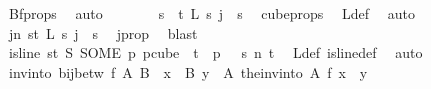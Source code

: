 \begin{isabellebody}
\ Bf{\isacharunderscore}{\kern0pt}props\ \isamarkupfalse%
\ auto\isanewline
\ \ \ \ \isamarkupfalse%
\ \isamarkupfalse%
\ {\isachardoublequoteopen}{\isasymforall}s\ {\isacharless}{\kern0pt}\ t{\isachardot}{\kern0pt}\ L\ s\ j\ {\isacharequal}{\kern0pt}\ s{\isachardoublequoteclose}\ \isamarkupfalse%
\ cube{\isacharunderscore}{\kern0pt}props{\isacharparenleft}{\kern0pt}{}{\isacharcomma}{\kern0pt}{}{\isacharparenright}{\kern0pt}\ \isamarkupfalse%
\ L{\isacharunderscore}{\kern0pt}def\ \isamarkupfalse%
\ auto\isanewline
\ \ \ \ \isamarkupfalse%
\ \isamarkupfalse%
\ {\isachardoublequoteopen}{\isacharparenleft}{\kern0pt}{\isasymexists}j{\isacharless}{\kern0pt}n{\isachardot}{\kern0pt}\ {\isasymforall}s{\isacharless}{\kern0pt}t{\isachardot}{\kern0pt}\ {\isacharparenleft}{\kern0pt}L\ s\ j\ {\isacharequal}{\kern0pt}\ s{\isacharparenright}{\kern0pt}{\isacharparenright}{\kern0pt}{\isachardoublequoteclose}\ \isamarkupfalse%
\ j{\isacharunderscore}{\kern0pt}prop\ \isamarkupfalse%
\ blast\isanewline
\ \ \isamarkupfalse%
\isanewline
\ \ \isamarkupfalse%
\ \isamarkupfalse%
\ {\isachardoublequoteopen}is{\isacharunderscore}{\kern0pt}line\ {\isacharparenleft}{\kern0pt}{\isasymlambda}s{\isasymin}{\isacharbraceleft}{\kern0pt}{\isachardot}{\kern0pt}{\isachardot}{\kern0pt}{\isacharless}{\kern0pt}t{\isacharbraceright}{\kern0pt}{\isachardot}{\kern0pt}\ S\ {\isacharparenleft}{\kern0pt}SOME\ p{\isachardot}{\kern0pt}\ p{\isasymin}cube\ {}\ t\ {\isasymand}\ p\ {}\ {\isacharequal}{\kern0pt}\ s{\isacharparenright}{\kern0pt}{\isacharparenright}{\kern0pt}\ n\ t{\isachardoublequoteclose}\ \isamarkupfalse%
\ L{\isacharunderscore}{\kern0pt}def\ is{\isacharunderscore}{\kern0pt}line{\isacharunderscore}{\kern0pt}def\ \isamarkupfalse%
\ auto\isanewline
{}\isamarkupfalse%
%
\endisatagproof
{\isafoldproof}%
%
\isadelimproof
\isanewline
%
\endisadelimproof
\isanewline
{}\isamarkupfalse%
\ invinto{\isacharcolon}{\kern0pt}\ {\isachardoublequoteopen}bij{\isacharunderscore}{\kern0pt}betw\ f\ A\ B\ {\isasymLongrightarrow}\ {\isacharparenleft}{\kern0pt}{\isasymforall}x\ {\isasymin}\ B{\isachardot}{\kern0pt}\ {\isasymexists}{\isacharbang}{\kern0pt}y\ {\isasymin}\ A{\isachardot}{\kern0pt}\ {\isacharparenleft}{\kern0pt}the{\isacharunderscore}{\kern0pt}inv{\isacharunderscore}{\kern0pt}into\ A\ f{\isacharparenright}{\kern0pt}\ x\ {\isacharequal}{\kern0pt}\ y{\isacharparenright}{\kern0pt}{\isachardoublequoteclose}\ \isanewline

\end{isabellebody}

